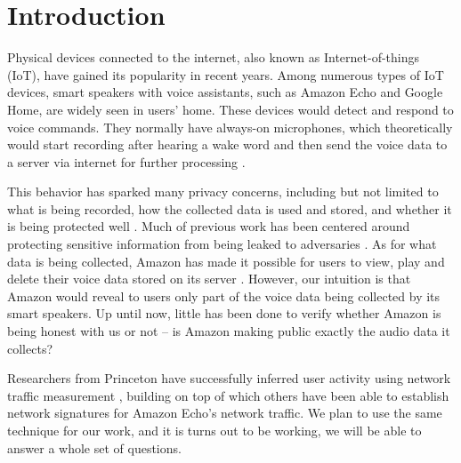 \section{Introduction}
Physical devices connected to the internet, also known as Internet-of-things (IoT), have gained its popularity in recent years. Among numerous types of IoT devices, smart speakers with voice assistants, such as Amazon Echo and Google Home, are widely seen in users' home. These devices would detect and respond to voice commands. They normally have always-on microphones, which theoretically would start recording after hearing a wake word and then send the voice data to a server via internet for further processing \cite{AmazonEc68:online}.

This behavior has sparked many privacy concerns, including but not limited to what is being recorded, how the collected data is used and stored, and whether it is being protected well \cite{lau2018alexa, fowler_2019, apthorpe2017smart, apthorpe2019keeping, apthorpe2017spying}. Much of previous work has been centered around protecting sensitive information from being leaked to adversaries \cite{apthorpe2017smart, apthorpe2019keeping, apthorpe2017spying}. As for what data is being collected, Amazon has made it possible for users to view, play and delete their voice data stored on its server \cite{ford2019alexa}. However, our intuition is that Amazon would reveal to users only part of the voice data being collected by its smart speakers. Up until now, little has been done to verify whether Amazon is being honest with us or not -- is Amazon making public exactly the audio data it collects?

Researchers from Princeton have successfully inferred user activity using network traffic measurement \cite{apthorpe2017spying}, building on top of which others have been able to establish network signatures for Amazon Echo's network traffic. We plan to use the same technique for our work, and it is turns out to be working, we will be able to answer a whole set of questions.
